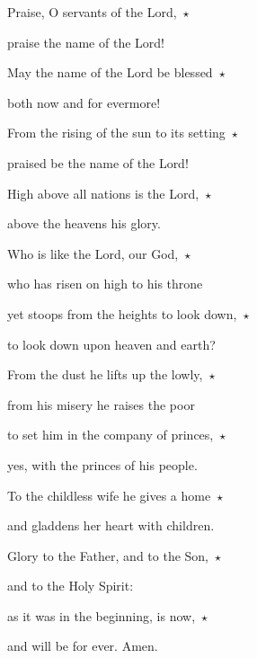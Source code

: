 \noindent Praise, O servants of the Lord,~$\star$~\nopagebreak

praise the name of the Lord!

\noindent May the name of the Lord be blessed~$\star$~\nopagebreak

both now and for evermore!

\noindent From the rising of the sun to its setting~$\star$~\nopagebreak

praised be the name of the Lord!

\noindent High above all nations is the Lord,~$\star$~\nopagebreak

above the heavens his glory.

\noindent Who is like the Lord, our God,~$\star$~\nopagebreak

who has risen on high to his throne

\noindent yet stoops from the heights to look down,~$\star$~\nopagebreak

to look down upon heaven and earth?

\noindent From the dust he lifts up the lowly,~$\star$~\nopagebreak

from his misery he raises the poor

\noindent to set him in the company of princes,~$\star$~\nopagebreak

yes, with the princes of his people.

\noindent To the childless wife he gives a home~$\star$~\nopagebreak

and gladdens her heart with children.

\noindent Glory to the Father, and to the Son,~$\star$~\nopagebreak

and to the Holy Spirit:

\noindent as it was in the beginning, is now,~$\star$~\nopagebreak

and will be for ever. Amen.
